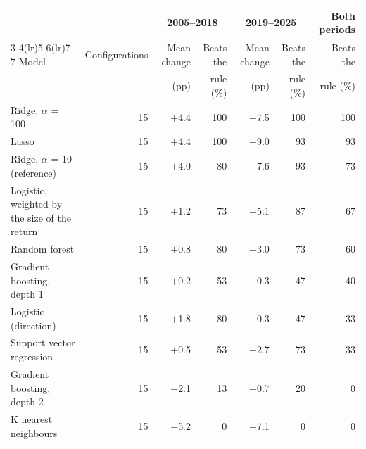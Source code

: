 \begin{tabular}{lrrrrrr}
\toprule
 & & \multicolumn{2}{c}{2005--2018} & \multicolumn{2}{c}{2019--2025} & Both periods \\
\cmidrule(lr){3-4}\cmidrule(lr){5-6}\cmidrule(lr){7-7}
Model & Configurations & Mean change & Beats the & Mean change & Beats the & Beats the \\
 & & (pp) & rule (\%) & (pp) & rule (\%) & rule (\%) \\
\midrule
Ridge, $\alpha$ = 100 & 15 & $+$4.4 & 100 & $+$7.5 & 100 & 100 \\
Lasso & 15 & $+$4.4 & 100 & $+$9.0 & 93 & 93 \\
Ridge, $\alpha$ = 10 (reference) & 15 & $+$4.0 & 80 & $+$7.6 & 93 & 73 \\
\addlinespace
Logistic, weighted by the size of the return & 15 & $+$1.2 & 73 & $+$5.1 & 87 & 67 \\
Random forest & 15 & $+$0.8 & 80 & $+$3.0 & 73 & 60 \\
Gradient boosting, depth 1 & 15 & $+$0.2 & 53 & $-$0.3 & 47 & 40 \\
Logistic (direction) & 15 & $+$1.8 & 80 & $-$0.3 & 47 & 33 \\
Support vector regression & 15 & $+$0.5 & 53 & $+$2.7 & 73 & 33 \\
Gradient boosting, depth 2 & 15 & $-$2.1 & 13 & $-$0.7 & 20 & 0 \\
K nearest neighbours & 15 & $-$5.2 & 0 & $-$7.1 & 0 & 0 \\
\bottomrule
\end{tabular}
